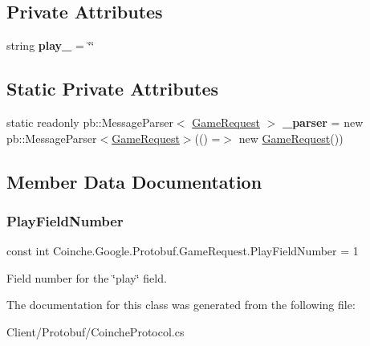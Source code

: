 \subsection*{Private Attributes}
\begin{DoxyCompactItemize}
\item 
\mbox{\label{class_coinche_1_1_google_1_1_protobuf_1_1_game_request_aef5067764431d1a990969f8eb043d4a9}} 
string {\bfseries play\+\_\+} = \char`\"{}\char`\"{}
\end{DoxyCompactItemize}
\subsection*{Static Private Attributes}
\begin{DoxyCompactItemize}
\item 
\mbox{\label{class_coinche_1_1_google_1_1_protobuf_1_1_game_request_a0095926611e6c62b0b43db4faf0303cc}} 
static readonly pb\+::\+Message\+Parser$<$ \hyperlink{class_coinche_1_1_google_1_1_protobuf_1_1_game_request}{Game\+Request} $>$ {\bfseries \+\_\+parser} = new pb\+::\+Message\+Parser$<$\hyperlink{class_coinche_1_1_google_1_1_protobuf_1_1_game_request}{Game\+Request}$>$(() =$>$ new \hyperlink{class_coinche_1_1_google_1_1_protobuf_1_1_game_request}{Game\+Request}())
\end{DoxyCompactItemize}


\subsection{Member Data Documentation}
\mbox{\label{class_coinche_1_1_google_1_1_protobuf_1_1_game_request_ab8aaf361fd25dc835cdcdf47aebb47b5}} 
\subsubsection{\texorpdfstring{Play\+Field\+Number}{PlayFieldNumber}}
{\footnotesize\ttfamily const int Coinche.\+Google.\+Protobuf.\+Game\+Request.\+Play\+Field\+Number = 1}



Field number for the \char`\"{}play\char`\"{} field.



The documentation for this class was generated from the following file\+:\begin{DoxyCompactItemize}
\item 
Client/\+Protobuf/Coinche\+Protocol.\+cs\end{DoxyCompactItemize}
